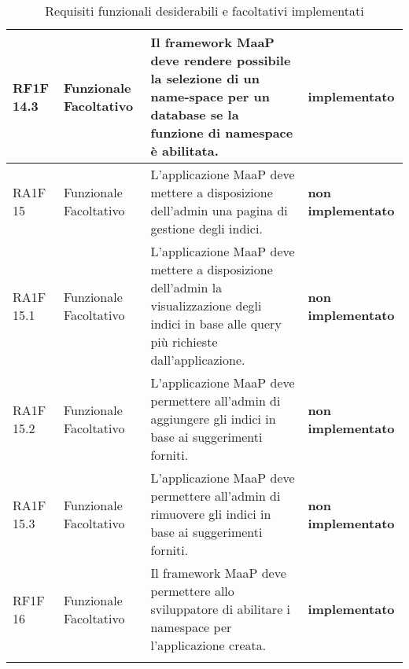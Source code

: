 \begin{longtable}{ | l | p{2cm} | p{5cm} | p{4cm}| }
        RF1F 14.3 & Funzionale \newline  Facoltativo  & Il framework MaaP deve rendere possibile la selezione di un name-space per un database se la funzione di namespace è abilitata. & \textbf{{\color{green} implementato}} \newline  \\ \hline      
        RA1F 15 & Funzionale \newline  Facoltativo  & L’applicazione MaaP deve mettere a disposizione dell’admin una pagina di gestione degli indici. & \textbf{{\color{red} non implementato}} \newline  \\ \hline      
        RA1F 15.1 & Funzionale \newline  Facoltativo  & L’applicazione MaaP deve mettere a disposizione dell’admin la visualizzazione degli indici in base alle query più richieste dall’applicazione. & \textbf{{\color{red} non implementato}} \newline  \\ \hline      
        RA1F 15.2 & Funzionale \newline  Facoltativo  & L’applicazione MaaP deve permettere all’admin di aggiungere gli indici in base ai suggerimenti forniti. & \textbf{{\color{red} non implementato}} \newline  \\ \hline      
        RA1F 15.3 & Funzionale \newline  Facoltativo  & L’applicazione MaaP deve permettere all’admin di rimuovere gli indici in base ai suggerimenti forniti. & \textbf{{\color{red} non implementato}} \newline  \\ \hline      
        RF1F 16 & Funzionale \newline  Facoltativo  & Il framework MaaP deve permettere allo sviluppatore di abilitare i namespace per l’applicazione creata. & \textbf{{\color{green} implementato}} \newline  \\ \hline      
       
      \caption{Requisiti funzionali desiderabili e facoltativi implementati}
      \end{longtable}
      \egroup 
\clearpage